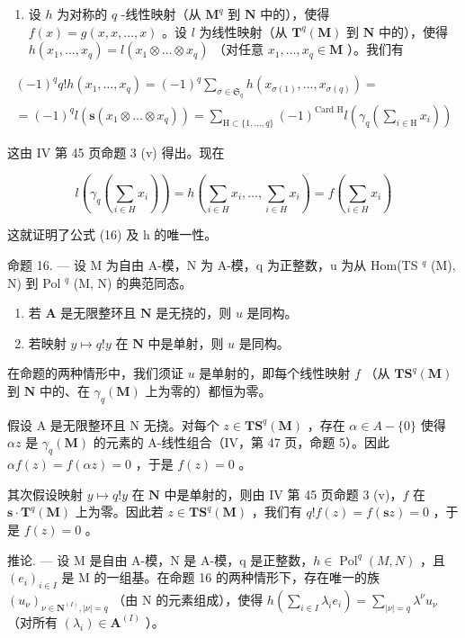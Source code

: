 \begin{enumerate}
\def\labelenumi{\alph{enumi})}
\setcounter{enumi}{1}
\tightlist
\item
  设 \(h\) 为对称的 \(q\) -线性映射（从 \(\mathbf{M}^q\) 到 \(\mathbf{N}\) 中的），使得 \(f(x) = g(x, x, \ldots, x)\) 。设 \(l\) 为线性映射（从 \(\mathbf{T}^q(\mathbf{M})\) 到 \(\mathbf{N}\) 中的），使得 \(h(x_1, \ldots, x_q) = l(x_1 \otimes \ldots \otimes x_q)\) （对任意 \(x_1, \ldots, x_q \in \mathbf{M}\) ）。我们有
\end{enumerate}

\[
\begin{array}{l} (- 1) ^ {q} q! h (x _ {1}, \dots , x _ {q}) = (- 1) ^ {q} \sum_ {\sigma \in \mathfrak {S} _ {q}} h (x _ {\sigma (1)}, \dots , x _ {\sigma (q)}) = \\ = (- 1) ^ {q} l (\mathbf {s} (x _ {1} \otimes \dots \otimes x _ {q})) = \sum_ {\mathrm{H} \subset \{1, \dots , q \}} (- 1) ^ {\text {Card H}} l \left(\gamma_ {q} \left(\sum_ {i \in \mathrm{H}} x _ {i}\right)\right) \end{array}
\]

这由 IV 第 45 页命题 3 (v) 得出。现在

\[
l \left(\gamma_ {q} \left(\sum_ {i \in H} x _ {i}\right)\right) = h \left(\sum_ {i \in H} x _ {i}, \dots , \sum_ {i \in H} x _ {i}\right) = f \left(\sum_ {i \in H} x _ {i}\right)
\]

这就证明了公式 (16) 及 h 的唯一性。

命题 16. --- 设 M 为自由 A-模，N 为 A-模，q 为正整数，u 为从 Hom(TS \(^{q}\) (M), N) 到 Pol \(^{q}\) (M, N) 的典范同态。

\begin{enumerate}
\def\labelenumi{(\roman{enumi})}
\item
  若 \(\mathbf{A}\) 是无限整环且 \(\mathbf{N}\) 是无挠的，则 \(u\) 是同构。
\item
  若映射 \(y \mapsto q!y\) 在 \(\mathbf{N}\) 中是单射，则 \(u\) 是同构。
\end{enumerate}

在命题的两种情形中，我们须证 \(u\) 是单射的，即每个线性映射 \(f\) （从 \(\mathbf{TS}^q(\mathbf{M})\) 到 \(\mathbf{N}\) 中的、在 \(\gamma_q(\mathbf{M})\) 上为零的）都恒为零。

假设 A 是无限整环且 N 无挠。对每个 \(z \in \mathbf{TS}^{q}(\mathbf{M})\) ，存在 \(\alpha \in A - \{0\}\) 使得 \(\alpha z\) 是 \(\gamma_{q}(\mathbf{M})\) 的元素的 A-线性组合（IV，第 47 页，命题 5）。因此 \(\alpha f(z) = f(\alpha z) = 0\) ，于是 \(f(z) = 0\) 。

其次假设映射 \(y \mapsto q!y\) 在 \(\mathbf{N}\) 中是单射的，则由 IV 第 45 页命题 3 (v)，\(f\) 在 \(\mathbf{s} \cdot \mathbf{T}^q(\mathbf{M})\) 上为零。因此若 \(z \in \mathbf{T}\mathbf{S}^q(\mathbf{M})\) ，我们有 \(q!f(z) = f(\mathbf{s}z) = 0\) ，于是 \(f(z) = 0\) 。

推论. --- 设 M 是自由 A-模，N 是 A-模，q 是正整数，\(h \in \operatorname{Pol}^{q}(M, N)\) ，且 \((e_{i})_{i \in I}\) 是 M 的一组基。在命题 16 的两种情形下，存在唯一的族 \((u_{\nu})_{\nu \in \mathbf{N}^{(I)}, |\nu| = q}\) （由 N 的元素组成），使得 \(h\left(\sum_{i \in I} \lambda_{i} e_{i}\right) = \sum_{|\nu| = q} \lambda^{\nu} u_{\nu}\) （对所有 \((\lambda_{i}) \in \mathbf{A}^{(I)}\) ）。

